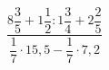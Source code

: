 \begin{ex}[type=calculate]
	\begin{condition}
		\( \dfrac{8\dfrac{3}{5}+1\dfrac{1}{2}:1\dfrac{3}{4}+2\dfrac{2}{5}}{\dfrac{1}{7}\cdot15,5-\dfrac{1}{7}\cdot7,2} \)
	\end{condition}
\end{ex}